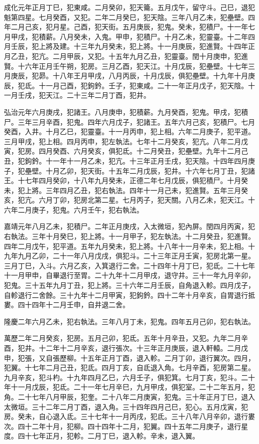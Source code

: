 \begin{pinyinscope}
成化元年正月丁巳，犯東咸。二月癸卯，犯天籥。五月戊午，留守斗。己巳，退犯魁第四星。七月癸酉，又犯。二年二月癸巳，犯天陰。三年八月乙未，犯壘壁。四年二月己亥，犯月星。己酉，犯天街。五月庚辰，犯鬼。癸未，犯積尸。十一年七月甲戌，犯積薪。八月癸未，入鬼。甲申，犯積尸。十月乙未，犯靈臺。十二年四月壬辰，犯上將及建。十三年九月癸未，犯上將。十一月庚辰，犯進賢。十四年正月乙丑，犯亢。二月甲辰，又犯。十五年九月乙丑，犯靈臺。閏十月庚申，犯進賢。十六年正月壬午朔，犯房。三月乙酉，犯天江。十月戊辰，犯壘壁。十七年三月庚辰，犯昴。十八年王月甲戌，八月丙辰，十月戊辰，俱犯壘壁。十九年十月庚辰，犯氐。十一月己酉，犯鉤鈐。壬子，犯東咸。二十一年正月戊子，犯天陰。十一月壬戌，犯天江。二十三年二月丁酉，犯井。

弘治元年六月庚戌，犯諸王。八月庚申，犯積薪。九月癸酉，犯鬼。甲戌，犯積尸。三年三月辛酉，犯鬼。四年六月戊子，犯諸王。五年六月己亥，犯積尸。七月癸酉，入井。十月乙巳，犯靈臺。十一月丙申，犯上相。六年二月庚子，犯平道。三月甲戌，犯上相。四月丙申，犯左執法。七年十二月癸亥，犯亢。八年二月戊寅，犯房。四月癸酉、六月癸亥，俱犯氐。十二月癸丑，犯壘壁。九年十二月己丑，犯鉤鈐。十一年十一月乙未，犯亢。十三年正月壬戌，犯天陰。十四年四月庚子，犯壘壁。十月乙卯，犯天街。十五年二月戊辰，犯井。十六年七月丁丑，犯諸王。十七年四月癸卯，十八年九月癸未，正德二年七月戊辰，俱犯積尸。十月癸未，犯上將。三年四月乙丑，犯右執法。四年十一月己未，犯進賢。五年三月癸亥，犯亢。六月丁卯，犯房北第二星。七月丙子，犯天關。八月乙未，犯天江。十六年二月庚子，犯鬼。六月壬午，犯右執法。

嘉靖元年八月乙未，犯積尸。二年正月庚戌，入太微垣，犯內屏。閏四月丙寅，犯右執法。三年十月癸巳，犯上將。十一月甲子，犯左執法。十二月癸丑，犯進賢。四年二月戊午，犯平道。五年九月癸未，犯上將。十八年十一月辛未，犯上相。十九年九月乙卯，二十一年八月戊戌，俱犯斗。二十三年正月壬寅，犯房北第一星。三月丁巳，入斗。六月乙亥，入箕退行二舍。二十四年十月丁巳，犯氐。二十七年十一月甲申，自畢退行至胃。二十九年十二月甲戌，退守井。三十一年九月辛卯，犯鬼。三十五年九月丁丑，犯上將。三十六年二月壬辰，自角退入軫。四月戊子，自軫退行二舍餘。三十九年十二月甲寅，犯鉤鈐。四十二年十月辛亥，自胃退行抵婁。四十四年十二月壬申，自井退二舍。

隆慶二年六月乙未，犯右執法。三年八月丁未，犯鬼。四年五月己卯，犯右執法。

萬歷二年二月癸亥，犯房。五月己卯，犯氐。五年十月辛丑，又犯。九年二月辛酉，犯井。十二年十二月辛亥，退行張次。十三年正月庚辰，退入軒轅。二月戊申，犯張，又自張歷柳。十五年正月丁酉，退入軫。二月丁卯，退行翼次。四月，犯翼。十七年二月己丑，犯氐。四月丁亥，自氐退入角。七月辛酉，犯房第二星。九月辛亥，犯斗杓。十九年四月乙巳，六月壬子，俱犯箕。七月丁亥，犯斗。二十年十一月戊辰，犯氐。二十一年七月辛巳，九月甲戌，俱犯室。二十二年五月，犯角。二十七年八月甲辰，犯奎。二十八年二月庚寅，犯鬼。三十年正月丁巳，退入太微垣。三十二年二月丁酉，退入角。三十四年四月己巳，犯心。五月戊寅，犯房。癸未，自心退入氐。三十七年十一月丙戌，犯氐。三十八年八月辛卯，退行婁次。四十二年十月，犯柳。四十四年十二月，犯翼。四十五年二月庚子，退行星度。四十七年正月，犯軫。二月丁巳，退入軫。辛未，退入翼。


\end{pinyinscope}
